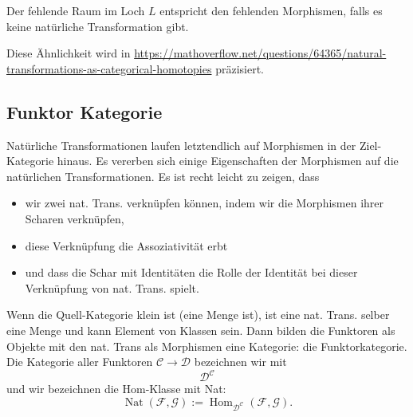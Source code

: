 \documentclass[a4paper]{amsart}
\theoremstyle{definition}
\begin{document}
Der fehlende Raum im Loch $L$ entspricht den fehlenden Morphismen, falls es keine natürliche Transformation gibt. 

Diese Ähnlichkeit wird in 
{\tiny 
   \url{https://mathoverflow.net/questions/64365/natural-transformations-as-categorical-homotopies}
}
präzisiert.

\subsection{Funktor Kategorie}
Natürliche Transformationen laufen letztendlich auf Morphismen in der Ziel-Kategorie hinaus. Es vererben sich einige Eigenschaften der Morphismen auf die natürlichen Transformationen. Es ist recht leicht zu zeigen, dass
\begin{itemize}
	\item wir zwei nat. Trans. verknüpfen können, indem wir die Morphismen ihrer Scharen verknüpfen,
	\item diese Verknüpfung die Assoziativität erbt
	\item und dass die Schar mit Identitäten die Rolle der Identität bei dieser Verknüpfung von nat. Trans. spielt.
\end{itemize}
Wenn die Quell-Kategorie klein ist (eine Menge ist), ist eine nat. Trans. selber eine Menge und kann Element von Klassen sein. Dann bilden die Funktoren als Objekte mit den nat. Trans als Morphismen eine Kategorie: die Funktorkategorie. Die Kategorie aller Funktoren $\mathcal C \to \mathcal D$ bezeichnen wir mit
\begin{equation*}
	\mathcal D ^{\mathcal C}
\end{equation*}
und wir bezeichnen die Hom-Klasse mit Nat:
\begin{equation*}
	\operatorname{Nat}( \mathcal F, \mathcal G) := \operatorname{Hom}_{\mathcal D ^{\mathcal C}}( \mathcal F, \mathcal G).
\end{equation*}

\end{document}
